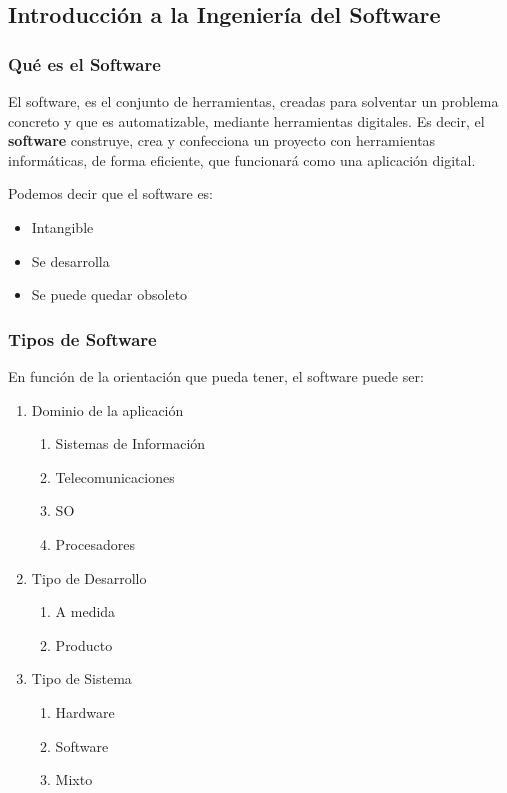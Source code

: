 \subsection{Introducción a la Ingeniería del Software}
\subsubsection{Qué es el Software}
\noindent El software, es el conjunto de herramientas, creadas para solventar un problema concreto y que es automatizable, mediante herramientas digitales. Es decir, el \textbf{software} construye, crea y confecciona un proyecto con herramientas informáticas, de forma eficiente, que funcionará como una aplicación digital.\par
\noindent Podemos decir que el software es:
\begin{itemize}
        \item Intangible
        \item Se desarrolla
        \item Se puede quedar obsoleto
\end{itemize}
\subsubsection{Tipos de Software}
\noindent En función de la orientación que pueda tener, el software puede ser:
\begin{enumerate}
        \item Dominio de la aplicación
              \begin{enumerate}
                      \item Sistemas de Información
                      \item Telecomunicaciones
                      \item SO
                      \item Procesadores

              \end{enumerate}
        \item Tipo de Desarrollo
              \begin{enumerate}
                      \item A medida
                      \item Producto
              \end{enumerate}

        \item Tipo de Sistema
              \begin{enumerate}
                      \item Hardware
                      \item Software
                      \item Mixto
              \end{enumerate}
\end{enumerate}
